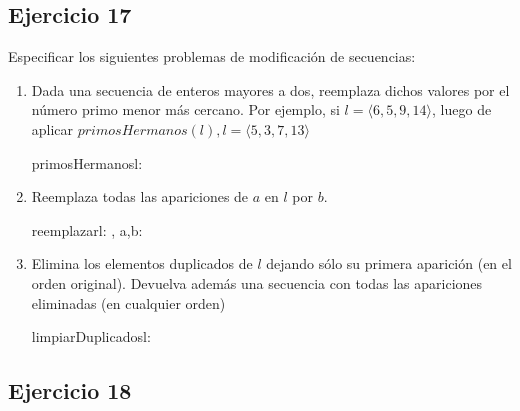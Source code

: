\subsection{Ejercicio 17}
Especificar los siguientes problemas de modificación de secuencias:

\begin{enumerate}[label=\alph*)]
      \item Dada una secuencia de enteros mayores a dos, reemplaza dichos valores por el número primo menor más cercano. Por ejemplo, si $l = \langle 6, 5, 9, 14 \rangle$, luego de aplicar $primosHermanos(l), l = \langle 5, 3, 7, 13 \rangle$

            \begin{proc}{primosHermanos}{\Inout l: \TLista{\ent}}{}

            \end{proc}

      \item Reemplaza todas las apariciones de $a$ en $l$ por $b$.

            \begin{proc}{reemplazar}{\Inout l: \seqchar, \In a,b: \cha}{}
            \end{proc}

      \item Elimina los elementos duplicados de $l$ dejando sólo su primera aparición (en el orden original). Devuelva además una secuencia con todas las apariciones eliminadas (en cualquier orden)

            \begin{proc}{limpiarDuplicados}{\Inout l: \seqchar}{\seqchar}
                  \asegura{} \hacer
            \end{proc}
\end{enumerate}

\subsection{Ejercicio 18}
\hacer


